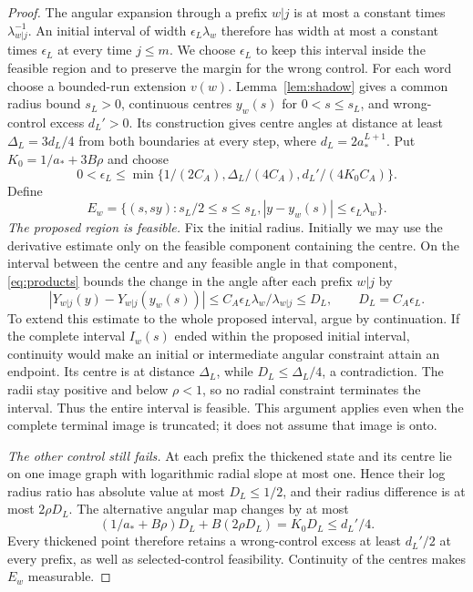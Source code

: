 \documentclass[11pt]{amsart}
\theoremstyle{definition}
\theoremstyle{remark}
\numberwithin{equation}{section}
\begin{document}
\begin{proof}
The angular expansion through a prefix $w|j$ is at most a constant
times $\lambda_{w|j}^{-1}$. An initial interval of width
$\epsilon_L\lambda_w$ therefore has width at most a constant
times $\epsilon_L$ at every time $j\le m$. We choose
$\epsilon_L$ to keep this interval inside the feasible region and
to preserve the margin for the wrong control.
For each word choose a bounded-run extension $v(w)$.
Lemma~\ref{lem:shadow} gives a common radius bound $s_L>0$,
continuous centres $y_w(s)$ for $0<s\le s_L$, and wrong-control
excess $d_L'>0$. Its construction gives centre angles at distance
at least $\Delta_L=3d_L/4$ from both boundaries at every step,
where $d_L=2a_*^{L+1}$.
Put $K_0=1/a_*+3B\rho$ and choose
\[
0<\epsilon_L\le\min\{1/(2C_A),\Delta_L/(4C_A),
                                      d_L'/(4K_0C_A)\}.
\]
Define
\begin{equation}\label{eq:forcedregion}
E_w=\{(s,sy):s_L/2\le s\le s_L,
                         |y-y_w(s)|\le\epsilon_L\lambda_w\}.
\end{equation}
\smallskip
\emph{The proposed region is feasible.}
Fix the initial radius. Initially we may use the derivative estimate
only on the feasible component containing the centre. On the
interval between the
centre and any feasible angle in that component, \eqref{eq:products} bounds the
change in the angle after each prefix $w|j$ by
\begin{equation}\label{eq:thickangle}
|Y_{w|j}(y)-Y_{w|j}(y_w(s))|
 \le C_A\epsilon_L\lambda_w/\lambda_{w|j}
 \le D_L,\qquad D_L=C_A\epsilon_L.
\end{equation}
To extend this estimate to the whole proposed interval, argue by
continuation. If the complete interval $I_w(s)$ ended within the proposed
initial interval, continuity would make an initial or intermediate
angular constraint attain an endpoint. Its centre is at distance
$\Delta_L$, while $D_L\le\Delta_L/4$, a contradiction.
The radii stay positive and below $\rho<1$, so no radial constraint
terminates the interval. Thus the entire interval is feasible.
This argument applies even when the complete terminal image is
truncated; it does not assume that image is onto.

\smallskip
\emph{The other control still fails.}
At each prefix the thickened state and its centre lie on one image
graph with logarithmic radial slope at most one. Hence their log
radius ratio has absolute value at most $D_L\le1/2$, and their
radius difference is at most $2\rho D_L$.
The alternative angular map changes by at most
\[
(1/a_*+B\rho)D_L+B(2\rho D_L)=K_0D_L\le d_L'/4.
\]
Every thickened point therefore retains a wrong-control excess
at least $d_L'/2$ at every prefix, as well as selected-control
feasibility. Continuity of the centres makes $E_w$ measurable.


\end{proof}
\end{document}
